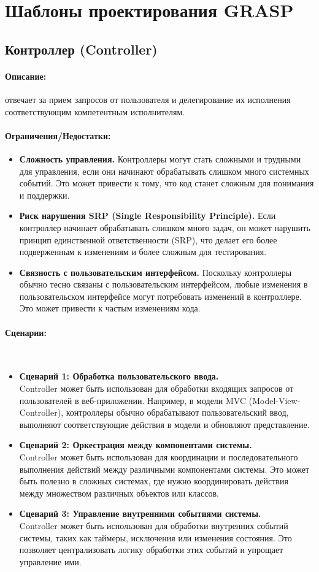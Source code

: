 \documentclass[12pt,onecolumn]{article}
\newcommand{\nparagraph}[1]{\paragraph{#1}\mbox{}\\}
\begin{document}
\section{Шаблоны проектирования GRASP}
\subsection{Контроллер (Controller)}
\paragraph{Описание:} отвечает за прием запросов от пользователя и делегирование их исполнения соответствующим компетентным исполнителям.
\paragraph{Ограничения/Недостатки:}
\begin{itemize}
  \item \textbf{Сложность управления.} Контроллеры могут стать сложными и трудными для управления, если они начинают обрабатывать слишком много системных событий. Это может привести к тому, что код станет сложным для понимания и поддержки.
  \item \textbf{Риск нарушения SRP (Single Responsibility Principle).} Если контроллер начинает обрабатывать слишком много задач, он может нарушить принцип единственной ответственности (SRP), что делает его более подверженным к изменениям и более сложным для тестирования.
  \item \textbf{Связность с пользовательским интерфейсом.} Поскольку контроллеры обычно тесно связаны с пользовательским интерфейсом, любые изменения в пользовательском интерфейсе могут потребовать изменений в контроллере. Это может привести к частым изменениям кода.
\end{itemize}
\nparagraph{Сценарии:}
\begin{itemize}
  \item{
    \textbf{Сценарий 1: Обработка пользовательского ввода.} \\
    Controller может быть использован для обработки входящих запросов от пользователей в веб-приложении. Например, в модели MVC (Model-View-Controller), контроллеры обычно обрабатывают пользовательский ввод, выполняют соответствующие действия в модели и обновляют представление.
  }
  \item{
    \textbf{Сценарий 2: Оркестрация между компонентами системы.} \\
    Controller может быть использован для координации и последовательного выполнения действий между различными компонентами системы. Это может быть полезно в сложных системах, где нужно координировать действия между множеством различных объектов или классов.
  }
  \item {
    \textbf{Сценарий 3: Управление внутренними событиями системы.} \\
    Controller может быть использован для обработки внутренних событий системы, таких как таймеры, исключения или изменения состояния. Это позволяет централизовать логику обработки этих событий и упрощает управление ими.
  }
\end{itemize}
\end{document}
